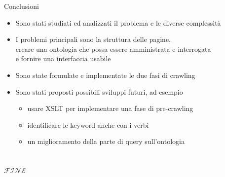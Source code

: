 \documentclass[dvips, 11pt]{beamer}
\begin{document}
\begin{frame}{Conclusioni}
  \begin{itemize}
  \item Sono stati studiati ed analizzati il \alert{problema} e le diverse \alert{complessit\`a}
    \pause
  \item I problemi principali sono la \alert{struttura delle pagine},\\
    creare una \alert{ontologia} che possa essere amministrata e interrogata\\
    e fornire una \alert{interfaccia} usabile
    \pause
  \item Sono state formulate e implementate le due fasi di crawling
    \pause
  \item Sono stati proposti possibili \alert{sviluppi futuri}, ad esempio
    \begin{itemize}
    \item usare \alert{XSLT} per implementare una fase di pre-crawling
    \item identificare le keyword anche con i \alert{verbi}
    \item un miglioramento della parte di query sull'ontologia
    \end{itemize}
  \end{itemize}
\end{frame}

\section*{}

\begin{frame}
  \begin{center}
    $\mathcal{FINE}$
  \end{center}
\end{frame}

\appendix

\section{\appendixname}
\end{document}
